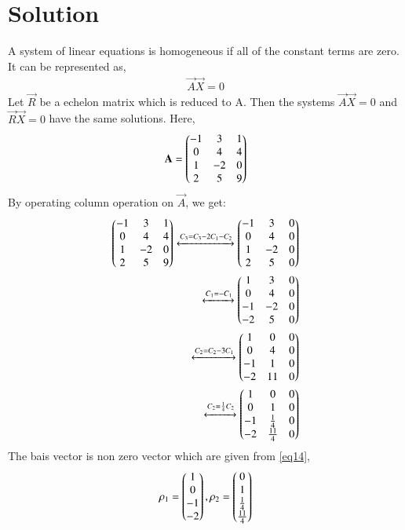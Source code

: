 \documentclass[journal,12pt,twocolumn]{IEEEtran}
\begin{document}
\section{Solution}
A system of linear equations is homogeneous if all of the constant terms are zero. It can be represented as,
\begin{align}
\vec{A}\vec{X}=0
\end{align}
Let $\vec{R}$  be  a echelon matrix which is reduced to  A.  Then  the  systems  $\vec{A}\vec{X}  =  0$  and  $\vec{R}\vec{X}  =  0$  have  the  same solutions.
Here, 
\begin{align}
\mathbf{A}=\begin{pmatrix}-1&3&1\\0&4&4\\1&-2&0\\2&5&9\end{pmatrix}
\end{align}
By operating column operation on $\vec{A}$, we get:
\begin{align}
\begin{pmatrix}-1&3&1\\0&4&4\\1&-2&0\\2&5&9\end{pmatrix}
 \xleftrightarrow{C_3=C_3-2C_1-C_2}\begin{pmatrix}-1&3&0\\0&4&0\\1&-2&0\\2&5&0\end{pmatrix}\\
  \xleftrightarrow{C_1=-C_1}\begin{pmatrix}1&3&0\\0&4&0\\-1&-2&0\\-2&5&0\end{pmatrix}\\
  \xleftrightarrow{C_2=C_2-3C_1}\begin{pmatrix}1&0&0\\0&4&0\\-1&1&0\\-2&11&0\end{pmatrix}\\
  \xleftrightarrow{C_2=\frac{1}{4}C_2}\begin{pmatrix}1&0&0\\0&1&0\\-1&\frac{1}{4}&0\\-2&\frac{11}{4}&0\end{pmatrix}\label{eq14}
\end{align}
The bais vector is non zero vector which are given from \ref{eq14},\\
\begin{align}
\rho_1=\begin{pmatrix}1\\0\\-1\\-2\end{pmatrix}, \rho_2=\begin{pmatrix}0\\1\\\frac{1}{4}\\\frac{11}{4}\end{pmatrix}
\end{align}
\end{document}
